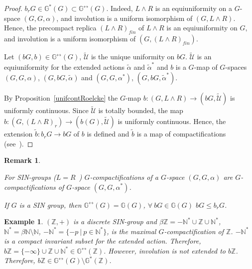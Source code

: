 \documentclass{amsart}
\newtheorem{ex}[thm]{Example}
\newtheorem{rem}[thm]{Remark}
\begin{document}
\begin{proof}
$b_r G\in \mathbb{G}^* (G)\subset\mathbb{G}^{\leftrightarrow} (G)$. Indeed, $L\wedge R$ is an equiuniformity on a $G$-space $(G, G, \alpha)$, and involution is a uniform isomorphism of $(G, L\wedge R)$. Hence, the precompact replica $(L\wedge R)_{fin}$ of $L\wedge R$ is an equiuniformity on $G$, and involution is a uniform isomorphism of $(G, (L\wedge R)_{fin})$.

Let $(b G, b)\in\mathbb{G}^{\leftrightarrow} (G)$, $\tilde{\mathcal U}$ is the unique uniformity on $b G$. $\tilde{\mathcal U}$ is an equiuniformity for the extended actions $\tilde\alpha$ and ${\tilde\alpha}^*$ and $b$ is a $G$-map of $G$-spaces $(G, G, \alpha)$, $(G, b G, \tilde\alpha)$ and  $(G, G, \alpha^*)$, $(G, b G, {\tilde\alpha}^*)$. 

By Proposition~\ref{unifcontRoelcke} the $G$-map  $b: (G, L\wedge R)\to (b G, \tilde{\mathcal U})$ is uniformly continuous. Since $\tilde{\mathcal U}$ is totally bounded, the map $b: (G, (L\wedge R)_r)\to (b(G), \tilde{\mathcal U})$ is uniformly continuous. Hence, the extension $\tilde b: b_r G\to b G$ of $b$ is defined and $\tilde b$ is a map of compactifications (see~\cite[Lemma 3.5.6]{Engelking}). 
\end{proof}

\begin{rem}\label{examp36}
{\rm For SIN-groups ($L=R$~\cite[Proposition 2.17]{RD}) $G$-compactifications of a $G$-space $(G, G, \alpha)$ are $G$-compactifications of $G$-space $(G, G, \alpha^*)$. 

If $G$ is a SIN group, then $\mathbb{G}^{\leftrightarrow} (G)=\mathbb{G} (G)$, $\forall\ b G\in \mathbb{G} (G)$ $b G\leq b_r G$.}
\end{rem}

\begin{ex}\label{examp36}
{\rm $(\mathbb Z, +)$ is a discrete SIN-group and $\beta\mathbb Z=-\mathbb N^*\cup\mathbb Z\cup\mathbb N^*$, $\mathbb N^*=\beta\mathbb N\setminus\mathbb N$, $-\mathbb N^*=\{-p\ |\ p\in\mathbb N^*\}$, is the maximal $G$-compactification of $\mathbb Z$. $-\mathbb N^*$ is a compact invariant subset for the extended action. Therefore, $b\mathbb Z=\{-\infty\}\cup\mathbb Z\cup \mathbb N^*\in\mathbb G^{\leftrightarrow}(\mathbb Z)$. However, involution is not extended to $b\mathbb Z$. Therefore, $b\mathbb Z\in\mathbb{G}^{\leftrightarrow} (G)\setminus\mathbb G^*(\mathbb Z)$.}
\end{ex}

\end{document}
